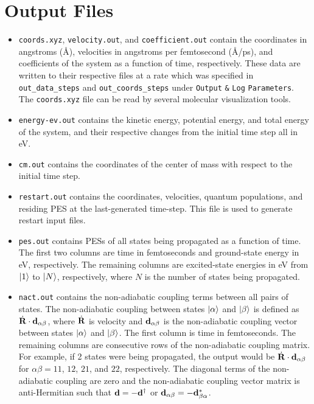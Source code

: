 \documentclass[letterpaper,12pt,titlepage]{article}
\begin{document}
\section{Output Files}
\begin{itemize}
\item \verb+coords.xyz+, \verb+velocity.out+, and \verb+coefficient.out+ contain the coordinates in angstroms (\AA), velocities in angstroms per femtosecond (\AA/ps), and coefficients of the system as a function of time, respectively.  These data are written to their respective files at a rate which was specified in \verb+out_data_steps+ and \verb+out_coords_steps+ under \verb+Output+ \verb+&+ \verb+Log+ \verb+Parameters+.  The \verb+coords.xyz+ file can be read by several molecular visualization tools.
\item \verb+energy-ev.out+ contains the kinetic energy, potential energy, and total energy of the system, and their respective changes  from the initial time step all in eV.
\item \verb+cm.out+ contains the coordinates of the center of mass with respect to the initial time step.
\item \verb+restart.out+ contains the coordinates, velocities, quantum populations, and residing PES at the last-generated time-step.  This file is used to generate restart input files.
\item \verb+pes.out+ contains PESs of all states being propagated as a function of time.  The first two columns are time in femtoseconds and ground-state energy in eV, respectively.  The remaining columns are excited-state energies in eV from $\ket{1}$ to $\ket{N}$, respectively, where $N$ is the number of states being propagated.
\item \verb+nact.out+ contains the non-adiabatic coupling terms between all pairs of states.  The non-adiabatic coupling between states $\ket{\alpha}$ and $\ket{\beta}$ is defined as $\dot{{\bf{R}}}\cdot{\bf{d}}_{\alpha\beta}$, where $\dot{{\bf{R}}}$ is velocity and ${\bf{d}}_{\alpha\beta}$ is the non-adiabatic coupling vector between states $\ket{\alpha}$ and ${\ket{\beta}}$.  The first column is time in femtoseconds.  The remaining columns are consecutive rows of the non-adiabatic coupling matrix.  For example, if 2 states were being propagated, the output would be $\dot{{\bf{R}}}\cdot{\bf{d}}_{\alpha\beta}$ for $\alpha\beta=11$, $12$, $21$, and $22$, respectively.  The diagonal terms of the non-adiabatic coupling are zero and the non-adiabatic coupling vector matrix is anti-Hermitian such that ${\bf{d}}=-{\bf{d}}^{\dagger}$ or ${\bf{d}}_{\alpha\beta}=-{\bf{d}}_{\beta\alpha}^{*}$.

\end{itemize}
\end{document}
